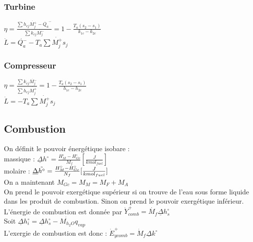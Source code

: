 \documentclass[../main.tex]{subfiles}
\begin{document}
\subsubsection{Turbine}
$\eta = \frac{\sum h_{cj} \dot{M_j^+} - \dot{Q_a}^-}{\sum k_{cj} \dot{M_j^-}} = 1-\frac{T_a (s_2-s_1)}{k_{1c}-k_{2c}}$\\
$\dot{L} = \dot{Q_a^-} - T_a \sum \dot{M^+_j}s_j$\\


\subsubsection{Compresseur}
$\eta = \frac{\sum k_{cj} \dot{M_j^-}}{\sum h_{cj} \dot{M_j^+}} = 1-\frac{T_a (s_2-s_1)}{h_{1c}-h_{2c}}$\\
$\dot{L} =  - T_a \sum \dot{M^+_j}s_j$\\

\subsection{Combustion}
On définit le pouvoir énergétique isobare :\\
massique : $\underline{\Delta}h^{\circ} = \frac{H_M^{\circ}-H_{Gc}^{\circ}}{M_f}[\frac{J}{kmol_{fuel}}]$\\
molaire : $\underline{\Delta}\Tilde{h^{\circ}} = \frac{H_M^{\circ}-H_{Gc}^{\circ}}{N_f}[\frac{J}{kmol_{fuel}}]$\\

On a maintenant $M_{Gc} = M_M = M_F+M_A$\\
On prend le pouvoir exergétique supérieur si on trouve de l'eau sous forme liquide dans les produit de combustion. Sinon on prend le pouvoir exergétique inférieur.\\

L'énergie de combustion est donnée par $\dot{Y}_{comb}^+ = \dot{M_f} \underline{\Delta}h_s^{\circ}$\\

Soit $\underline{\Delta}h_i^{\circ} = \underline{\Delta}h_s^{\circ} - \dot{M_{h_2O}} q_{vap}$\\
L'exergie de combustion est donc : $\dot{E}_{ycomb}^+ = \dot{M}_f \underline{\Delta}k^{\circ}$\\
\end{document}
